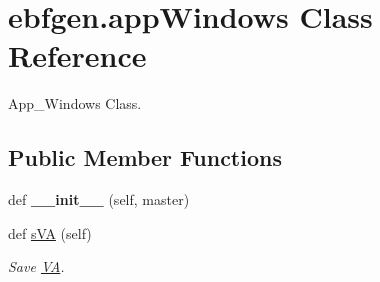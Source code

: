 \hypertarget{classebfgen_1_1appWindows}{}\section{ebfgen.\+app\+Windows Class Reference}
\label{classebfgen_1_1appWindows}


App\+\_\+\+Windows Class.  


\subsection*{Public Member Functions}
\begin{DoxyCompactItemize}
\item 
\mbox{\label{classebfgen_1_1appWindows_aea0154d6c57d1d669168d3b27fed6821}} 
def {\bfseries \+\_\+\+\_\+init\+\_\+\+\_\+} (self, master)
\item 
def \hyperlink{classebfgen_1_1appWindows_ade756391968e89e24255b286f30d0bd8}{s\+VA} (self)
\begin{DoxyCompactList}\small\item\em Save \hyperlink{classebfgen_1_1VA}{VA}. \end{DoxyCompactList}\end{DoxyCompactItemize}
